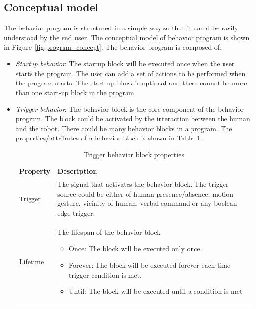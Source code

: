 \subsection{Conceptual model}
The behavior program is structured in a simple way so that it could be easily understood by the end user. The conceptual model of behavior program is shown in Figure~\ref{fig:program_concept}. The behavior program is composed of:
\begin{itemize}
\item \emph{Startup behavior}: The startup block will be executed once when the user starts the program. The user can add a set of actions to be performed when the program starts. The start-up block is optional and there cannot be more than one start-up block in the program
\item \emph{Trigger behavior}: The behavior block is the core component of the behavior program. The block could be activated by the interaction between the human and the robot. There could be many behavior blocks in a program. The properties/attributes of a behavior block is shown in Table~\ref{table:behavior_block}.
\begin{table}[H]
\centering
\small
\caption{Trigger behavior block properties}
\label{table:behavior_block}
\begin{tabular}{|l|p{11cm}|}
\hline
  \textbf{Property} & \textbf{Description}
  \tabularnewline \hline
  
  Trigger & The signal that activates the behavior block. The trigger source could be either of human presence/absence, motion gesture, vicinity of human, verbal command or any boolean edge trigger.
                                          \tabularnewline\hline
                                          
  Lifetime & The lifespan of the behavior block. \begin{itemize}[leftmargin=*,topsep={0pt},itemsep={0pt},partopsep={0pt},parsep={0pt}]
                                                                      \item Once: The block will be executed only once.
                                                                      \item Forever: The block will be executed forever each time trigger condition is met.
                                                                      \item Until: The block will be executed until a condition is met
                                                                   \end{itemize}
                                          \tabularnewline\hline
  

\end{tabular}
\end{table}
\end{itemize}
